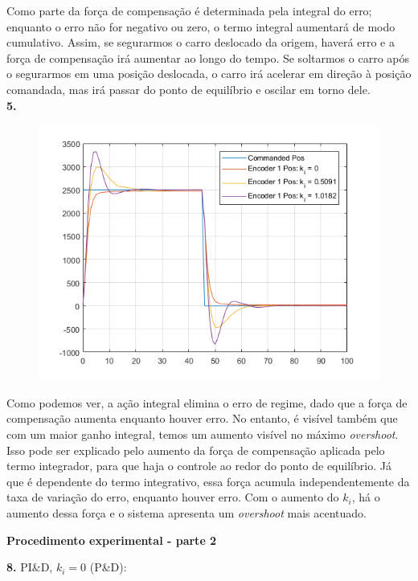 \documentclass[a4paper,11pt]{article}
\begin{document}
Como parte da força de compensação é determinada pela integral do erro; enquanto
o erro não for negativo ou zero, o termo integral aumentará de modo cumulativo.
Assim, se segurarmos o carro deslocado da origem, haverá erro e a força de
compensação irá aumentar ao longo do tempo. Se soltarmos o carro após o
segurarmos em uma posição deslocada, o carro irá acelerar em direção à posição
comandada, mas irá passar do ponto de equilíbrio e oscilar em torno dele. \\

\textbf{5.}

\begin{figure}[H]
\includegraphics{q05}
\centering
\end{figure}

Como podemos ver, a ação integral elimina o erro de regime, dado que a força de
compensação aumenta enquanto houver erro. No entanto, é visível também que com
um maior ganho integral, temos um aumento visível no máximo \textit{overshoot}.
Isso pode ser explicado pelo aumento da força de compensação aplicada pelo termo
integrador, para que haja o controle ao redor do ponto de equilíbrio. Já que é
dependente do termo integrativo, essa força acumula independentemente da taxa de
variação do erro, enquanto houver erro. Com o aumento do $k_i$, há o aumento
dessa força e o sistema apresenta um \textit{overshoot} mais acentuado. \\

\pagebreak

\textbf{Procedimento experimental - parte 2}

\textbf{8.}
PI\&D, $k_i = 0$ (P\&D):
\end{document}
